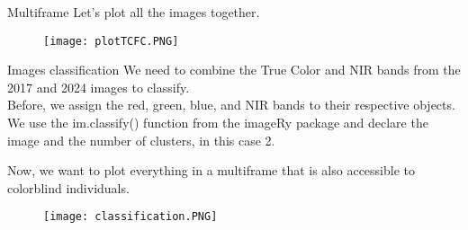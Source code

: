 \documentclass{beamer}
\begin{document}
\begin{frame}{Multiframe}
    Let's plot all the images together.

      
\vspace{-0.3cm}
\begin{figure}
    \centering
    \texttt{[image: plotTCFC.PNG]}
    \label{fig:enter-label}
\end{figure}
\end{frame}

\begin{frame}{Images classification}
  We need to combine the True Color and NIR bands from the 2017 and 2024 images to classify. \\ Before, we assign the red, green, blue, and NIR bands to their respective objects.
  \\ We use the im.classify() function from the imageRy package and declare the image and the number of clusters, in this case 2.

    

\end{frame}

\begin{frame}{}
Now, we want to plot everything in a multiframe that is also accessible to colorblind individuals.
    
      

\vspace{-0.3cm}
  
    \begin{figure}
        \centering
        \texttt{[image: classification.PNG]}
        \label{fig:enter-label}
    \end{figure}

\end{frame}
\end{document}
